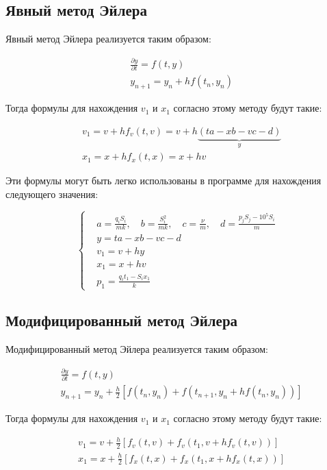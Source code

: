 \documentclass[12pt, a4paper]{article}
\begin{document}
\subsection{Явный метод Эйлера}

Явный метод Эйлера реализуется таким образом:

$$\begin{aligned}
&\frac{\partial y}{\partial t} = f(t, y) \\
&y_{n+1} = y_n + h f(t_n, y_n)
\end{aligned}$$

Тогда формулы для нахождения $v_1$ и $x_1$ согласно этому методу будут такие:

$$\begin{aligned}
&v_1 = v + h f_v(t, v) = v + h \underbrace{(t a - x b - v c - d)}_y \\
&x_1 = x + h f_x(t, x) = x + h v
\end{aligned}$$

Эти формулы могут быть легко использованы в программе для нахождения следующего значения:

$$\left\{\begin{aligned}
&a = \frac{q_i S_i}{m k},\quad b = \frac{S_i^2}{m k},\quad c = \frac{\nu}{m},\quad d = \frac{p_j S_j-10^5 S_i}{m} \\
&y = t a - x b - v c - d \\
&v_1 = v + h y \\
&x_1 = x + h v \\
&p_1 = \frac{q_i t_1 - S_i x_1}{k}
\end{aligned}\right.$$

\subsection{Модифицированный метод Эйлера}

Модифицированный метод Эйлера реализуется таким образом:

$$\begin{aligned}
&\frac{\partial y}{\partial t} = f(t, y) \\
&y_{n+1} = y_n + \frac{h}{2}\left[f(t_n, y_n) + f(t_{n+1}, y_n+h f(t_n, y_n))\right]
\end{aligned}$$

Тогда формулы для нахождения $v_1$ и $x_1$ согласно этому методу будут такие:

$$\begin{aligned}
&v_1 = v + \frac{h}{2}\left[f_v(t, v) + f_v(t_1, v+h f_v(t, v))\right] \\
&x_1 = x + \frac{h}{2}\left[f_x(t, x) + f_x(t_1, x+h f_x(t, x))\right]
\end{aligned}$$
\end{document}

